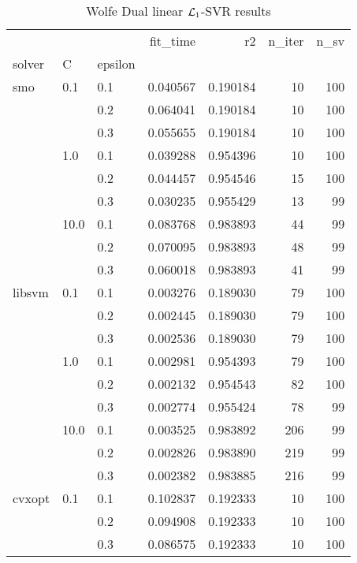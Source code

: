 \begin{table}[H]
\centering
\caption{Wolfe Dual linear $\protect \mathcal{L}_1$-SVR results}
\label{linear_dual_l1_svr_cv_results}
\begin{tabular}{lllrrrr}
\toprule
       &      &     &  fit\_time &        r2 &  n\_iter &  n\_sv \\
solver & C & epsilon &           &           &         &       \\
\midrule
smo & 0.1  & 0.1 &  0.040567 &  0.190184 &      10 &   100 \\
       &      & 0.2 &  0.064041 &  0.190184 &      10 &   100 \\
       &      & 0.3 &  0.055655 &  0.190184 &      10 &   100 \\
       & 1.0  & 0.1 &  0.039288 &  0.954396 &      10 &   100 \\
       &      & 0.2 &  0.044457 &  0.954546 &      15 &   100 \\
       &      & 0.3 &  0.030235 &  0.955429 &      13 &    99 \\
       & 10.0 & 0.1 &  0.083768 &  0.983893 &      44 &    99 \\
       &      & 0.2 &  0.070095 &  0.983893 &      48 &    99 \\
       &      & 0.3 &  0.060018 &  0.983893 &      41 &    99 \\
libsvm & 0.1  & 0.1 &  0.003276 &  0.189030 &      79 &   100 \\
       &      & 0.2 &  0.002445 &  0.189030 &      79 &   100 \\
       &      & 0.3 &  0.002536 &  0.189030 &      79 &   100 \\
       & 1.0  & 0.1 &  0.002981 &  0.954393 &      79 &   100 \\
       &      & 0.2 &  0.002132 &  0.954543 &      82 &   100 \\
       &      & 0.3 &  0.002774 &  0.955424 &      78 &    99 \\
       & 10.0 & 0.1 &  0.003525 &  0.983892 &     206 &    99 \\
       &      & 0.2 &  0.002826 &  0.983890 &     219 &    99 \\
       &      & 0.3 &  0.002382 &  0.983885 &     216 &    99 \\
cvxopt & 0.1  & 0.1 &  0.102837 &  0.192333 &      10 &   100 \\
       &      & 0.2 &  0.094908 &  0.192333 &      10 &   100 \\
       &      & 0.3 &  0.086575 &  0.192333 &      10 &   100 \\

\end{tabular}
\end{table}
